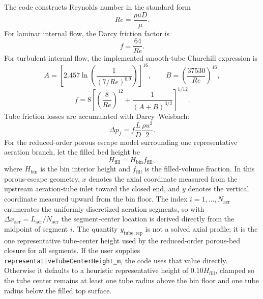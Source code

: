 \documentclass[11pt]{article}
\newcommand{\code}[1]{\nolinkurl{#1}}
\begin{document}
The code constructs Reynolds number in the standard form
\begin{equation}
\label{eq:reynolds}
Re=\frac{\rho u D}{\mu}.
\end{equation}
For laminar internal flow, the Darcy friction factor is
\begin{equation}
\label{eq:darcy_laminar}
f=\frac{64}{Re}.
\end{equation}
For turbulent internal flow, the implemented smooth-tube Churchill expression is
\begin{equation}
\label{eq:churchill_friction}
A=\left[2.457\ln\!\left(\frac{1}{(7/Re)^{0.9}}\right)\right]^{16},
\qquad
B=\left(\frac{37530}{Re}\right)^{16},
\end{equation}
\begin{equation}
\label{eq:churchill_friction_full}
f=8\left[\left(\frac{8}{Re}\right)^{12}+\frac{1}{(A+B)^{3/2}}\right]^{1/12}.
\end{equation}
Tube friction losses are accumulated with Darcy--Weisbach:
\begin{equation}
\label{eq:darcy_drop}
\Delta p_f=f\frac{L}{D}\frac{\rho u^2}{2}.
\end{equation}
For the reduced-order porous escape model surrounding one representative aeration branch, let the filled bed height be
\begin{equation}
\label{eq:filled_height}
H_{\mathrm{fill}}=H_{\mathrm{bin}}f_{\mathrm{fill}},
\end{equation}
where \(H_{\mathrm{bin}}\) is the bin interior height and \(f_{\mathrm{fill}}\) is the filled-volume fraction. In this porous-escape geometry, \(x\) denotes the axial coordinate measured from the upstream aeration-tube inlet toward the closed end, and \(y\) denotes the vertical coordinate measured upward from the bin floor. The index \(i=1,\dots,N_{\mathrm{aer}}\) enumerates the uniformly discretized aeration segments, so with \(\Delta x_{\mathrm{aer}}=L_{\mathrm{aer}}/N_{\mathrm{aer}}\) the segment-center location is derived directly from the midpoint of segment \(i\). The quantity \(y_{\mathrm{tube,rep}}\) is not a solved axial profile; it is the one representative tube-center height used by the reduced-order porous-bed closure for all segments. If the user supplies \code{representativeTubeCenterHeight\_m}, the code uses that value directly. Otherwise it defaults to a heuristic representative height of \(0.10H_{\mathrm{fill}}\), clamped so the tube center remains at least one tube radius above the bin floor and one tube radius below the filled top surface.
\end{document}
